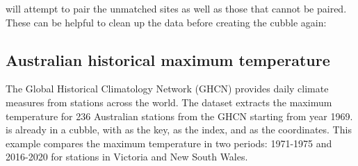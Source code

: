 \documentclass{article}
\newenvironment{Shaded}{\begin{snugshade}}{\end{snugshade}}
\newcommand{\AttributeTok}[1]{\textcolor[rgb]{0.77,0.63,0.00}{#1}}
\newcommand{\FunctionTok}[1]{\textcolor[rgb]{0.00,0.00,0.00}{#1}}
\newcommand{\NormalTok}[1]{#1}
\newcommand{\OtherTok}[1]{\textcolor[rgb]{0.56,0.35,0.01}{#1}}
\newcommand{\SpecialCharTok}[1]{\textcolor[rgb]{0.00,0.00,0.00}{#1}}
\newcommand{\StringTok}[1]{\textcolor[rgb]{0.31,0.60,0.02}{#1}}
\begin{document}
 will attempt to pair the unmatched sites as well as those that cannot be paired. These can be helpful to clean up the data before creating the cubble again:

\begin{Shaded}
\end{Shaded}

\hypertarget{australian-historical-maximum-temperature}{%
\subsection{Australian historical maximum temperature}\label{australian-historical-maximum-temperature}}

The Global Historical Climatology Network (GHCN) provides daily climate measures from stations across the world. The dataset  extracts the maximum temperature for 236 Australian stations from the GHCN starting from year 1969.  is already in a cubble, with  as the key,  as the index, and  as the coordinates. This example compares the maximum temperature in two periods: 1971-1975 and 2016-2020 for stations in Victoria and New South Wales.
\end{document}
